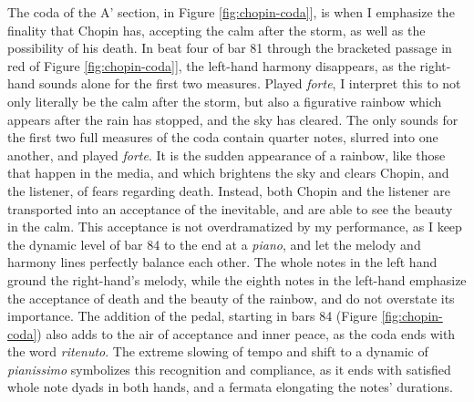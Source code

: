 The coda of the A' section, in Figure \ref{fig:chopin-coda}]\autocite{Hansen_1973}, is when I emphasize the finality that Chopin has, accepting the calm after the storm, as well as the possibility of his death. In beat four of bar 81 through the bracketed passage in red of Figure  \ref{fig:chopin-coda}]\autocite{Hansen_1973}, the left-hand harmony disappears, as the right-hand sounds alone for the first two measures. Played \textit{forte}, I interpret this to not only literally be the calm after the storm, but also a figurative rainbow which appears after the rain has stopped, and the sky has cleared. The only sounds for the first two full measures of the coda contain quarter notes, slurred into one another, and played \textit{forte}. It is the sudden appearance of a rainbow, like those that happen in the media, and which brightens the sky and clears Chopin, and the listener, of fears regarding death. Instead, both Chopin and the listener are transported into an acceptance of the inevitable, and are able to see the beauty in the calm. This acceptance is not overdramatized by my performance, as I keep the dynamic level of bar 84 to the end at a \textit{piano}, and let the melody and harmony lines perfectly balance each other. The whole notes in the left hand ground the right-hand's melody, while the eighth notes in the left-hand emphasize the acceptance of death and the beauty of the rainbow, and do not overstate its importance. The addition of the pedal, starting in bars 84 (Figure \ref{fig:chopin-coda}\autocite{Hansen_1973}) also adds to the air of acceptance and inner peace, as the coda ends with the word \textit{ritenuto}. The extreme slowing of tempo and shift to a dynamic of \textit{pianissimo} symbolizes this recognition and compliance, as it ends with satisfied whole note dyads in both hands, and a fermata elongating the notes' durations.
%
